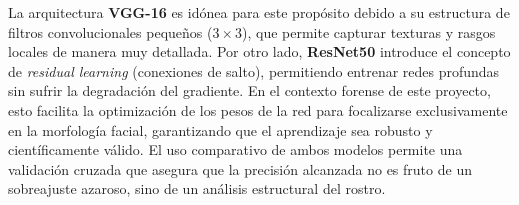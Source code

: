 La arquitectura \textbf{VGG-16} es idónea para este propósito debido a su estructura de filtros convolucionales pequeños ($3 \times 3$), que permite capturar texturas y rasgos locales de manera muy detallada. Por otro lado, \textbf{ResNet50} introduce el concepto de \textit{residual learning} (conexiones de salto), permitiendo entrenar redes profundas sin sufrir la degradación del gradiente. En el contexto forense de este proyecto, esto facilita la optimización de los pesos de la red para focalizarse exclusivamente en la morfología facial, garantizando que el aprendizaje sea robusto y científicamente válido. El uso comparativo de ambos modelos permite una validación cruzada que asegura que la precisión alcanzada no es fruto de un sobreajuste azaroso, sino de un análisis estructural del rostro.